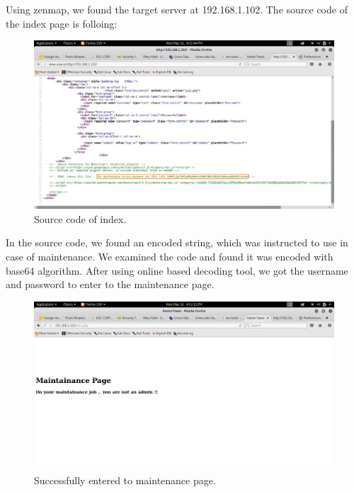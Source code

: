 \documentclass[12pt]{report}
\begin{document}
	Using zenmap, we found the target server at 192.168.1.102. The source code of the index page is folloing:
	
	\begin{figure}[H]
		\includegraphics[width=0.7\textheight,height=0.4\textheight]{images/1_4sourcecode.jpg}
		\caption{Source code of index.}
	\end{figure}
	
	In the source code, we found an encoded string, which was instructed to use in case of maintenance. We examined the code and found it was encoded with base64 algorithm. After using online based decoding tool, we got the username and password to enter to the maintenance page.
	\begin{figure}[H]
		\includegraphics[width=0.7\textheight,height=0.4\textheight]{images/1_4maintainance.jpg}
		\caption{Successfully entered to maintenance page.}
	\end{figure}
	
\end{document}
